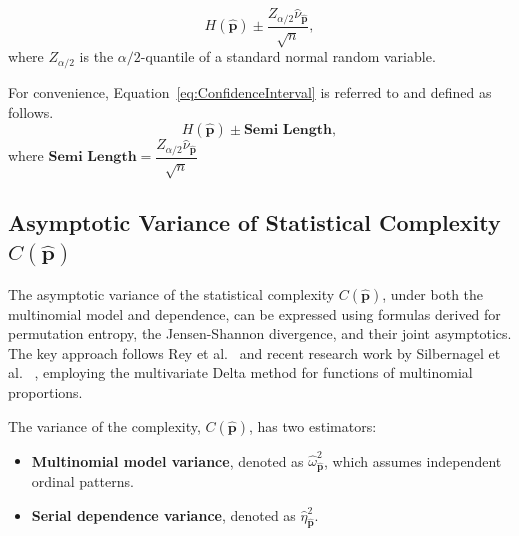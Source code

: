 \begin{equation}
  H(\widehat{\mathbf{p}})\pm \dfrac{Z_{\alpha/2}\widehat{\nu}_{\widehat{\mathbf{p}}}}{\sqrt{n}},
  \label{eq:ConfidenceInterval}
\end{equation} 
where $Z_{\alpha/2}$ is the $\alpha/2$-quantile of a standard normal random variable.

For convenience, Equation~\ref{eq:ConfidenceInterval} is referred to and defined as follows.
\begin{equation}
	H(\widehat{\mathbf{p}})\pm \textbf{Semi Length},
	\label{eq:CI}
\end{equation} 
where $\textbf{Semi Length}=\dfrac{Z_{\alpha/2}\widehat{\nu}_{\widehat{\mathbf{p}}}}{\sqrt{n}}$

\subsection{Asymptotic Variance of Statistical Complexity $C(\widehat{\mathbf{p}})$} \label{Subsec:AsympVarComplexity} 
The asymptotic variance of the statistical complexity $C(\widehat{\mathbf{p}})$, under both the multinomial model and dependence, can be expressed using formulas derived for permutation entropy, the Jensen-Shannon divergence, and their joint asymptotics. The key approach follows Rey et al.~\cite{Rey2025} and recent research work by Silbernagel et al.~\cite{silbernagel2025joint} , employing the multivariate Delta method for functions of multinomial proportions.


The variance of the complexity, $C(\widehat{\mathbf{p}})$, has two estimators:
\begin{itemize}
	\item \textbf{Multinomial model variance}, denoted as $\widehat{\omega}^2_{\widehat{\mathbf{p}}}$, which assumes independent ordinal patterns.
	\item \textbf{Serial dependence variance}, denoted as $\widehat{\eta}^2_{\widehat{\mathbf{p}}}$.
\end{itemize}

